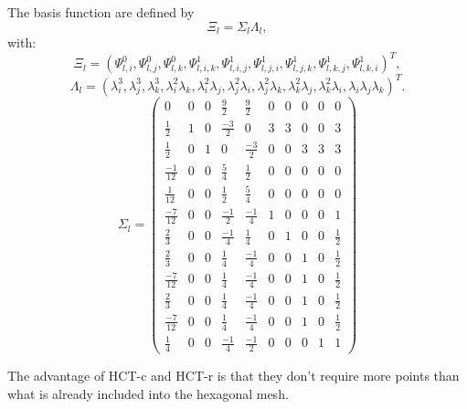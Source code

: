 \documentclass[proc]{edpsmath}
\begin{document}
The basis function are defined by 
\begin{equation*}
\Xi_l =  \Sigma_l \Lambda_l,
\end{equation*} 
 \noindent with:
\begin{equation*}
  \Xi_l=(\Psi_{l,i}^0, \Psi_{l,j}^0, \Psi_{l,k}^0, \Psi_{l,i,k}^1,\Psi_{l,i,j}^1,\Psi_{l,j,i}^1,\Psi_{l,j,k}^1 ,\Psi_{l,k,j}^1,\Psi_{l,k,i}^1)^T,
\end{equation*} 
\begin{equation*}
  \Lambda_l = ( \lambda_i^3,\lambda_j^3,\lambda_k^3,\lambda_i^2\lambda_k,\lambda_i^2\lambda_j,\lambda_j^2\lambda_i,\lambda_j^2\lambda_k,\lambda_k^2\lambda_j,\lambda_k^2\lambda_i,\lambda_i\lambda_j\lambda_k)^T.
\end{equation*}  
\begin{equation*}
\Sigma_l = 
\begin{pmatrix}
	0 & 0 & 0 & \frac{9}{2} & \frac{9}{2} & 0 & 0 & 0 & 0 & 0  \\
	\frac{1}{2} & 1 & 0 & \frac{-3}{2} & 0 & 3 & 3 & 0 & 0 & 3 \\
	\frac{1}{2} & 0 & 1 & 0 & \frac{-3}{2} & 0 & 0 & 3 & 3 & 3 \\	 
	\frac{-1}{12} & 0 & 0 & \frac{ 5}{4} & \frac{ 1}{2} & 0 & 0 & 0 & 0 & 0 \\	 
	\frac{ 1}{12} & 0 & 0 & \frac{ 1}{2} & \frac{ 5}{4} & 0 & 0 & 0 & 0 & 0 \\
	\frac{-7}{12} & 0 & 0 & \frac{-1}{2} & \frac{-1}{4} & 1 & 0 & 0 & 0 & 1 \\
    \frac{ 2}{3}& 0 & 0 & \frac{-1}{4} & \frac{ 1}{4} & 0 & 1 & 0 & 0 & \frac{1}{2} \\
	\frac{ 2}{3}& 0 & 0 & \frac{ 1}{4} & \frac{-1}{4} & 0 & 0 & 1 & 0 & \frac{1}{2} \\
    \frac{-7}{12} & 0 & 0 & \frac{ 1}{4} & \frac{-1}{4} & 0 & 0 & 1 & 0 & \frac{1}{2} \\
	\frac{ 2}{3}& 0 & 0 & \frac{ 1}{4} & \frac{-1}{4} & 0 & 0 & 1 & 0 & \frac{1}{2} \\
    \frac{-7}{12} & 0 & 0 & \frac{ 1}{4} & \frac{-1}{4} & 0 & 0 & 1 & 0 & \frac{1}{2} \\
	\frac{1}{4} & 0 & 0 & \frac{-1}{4} & \frac{-1}{2} & 0 & 0 & 0 & 1 & 1 
\end{pmatrix}
\end{equation*}

The advantage of HCT-c and HCT-r is that they don't require more points than what is already included into the hexagonal mesh.
\end{document}
